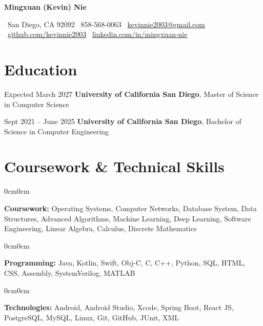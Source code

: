 \documentclass[8pt, letterpaper]{article}
\newcommand{\phone}[1]{\faPhone\ #1}
\newcommand{\email}[1]{\faEnvelope\ \href{mailto:#1}{#1}}
\newcommand{\github}[1]{\faGithub\ \href{https://#1}{#1}}
\newcommand{\linkedin}[1]{\faLinkedin\ \href{https://#1}{#1}}
\newcommand{\basicInfo}[1]{\par\noindent\small #1}
\newcommand{\addr}[1]{\faMapMarker*~#1}
\newenvironment{onecolentry}{
  \begin{adjustwidth}{0cm}{0cm}
}{
  \end{adjustwidth}
}
\newenvironment{header}{
  \setlength{\topsep}{0pt}\par\kern\topsep\centering\linespread{1.5}
}{
  \par\kern\topsep
}
\begin{document}
\normalsize

\begin{header}
  \fontsize{20pt}{20pt}\selectfont\textbf{Mingxuan (Kevin) Nie}

  \vspace{2pt}
  \basicInfo{
    \addr{San Diego, CA 92092}\quad
    \phone{858-568-0063}\quad
    \email{kevinnie2003@gmail.com}\quad
    \github{github.com/kevinnie2003}\quad
    \linkedin{linkedin.com/in/mingxuan-nie}
  }
\end{header}


\vspace{5pt}

\section{Education}

\begin{twocolentry}{Expected March 2027}
\textbf{University of California San Diego}, Master of Science in Computer Science
\end{twocolentry}

\begin{twocolentry}{Sept 2021 – June 2025}
\textbf{University of California San Diego}, Bachelor of Science in Computer Engineering
\end{twocolentry}

\section{Coursework \& Technical Skills}

\begin{onecolentry}
\textbf{Coursework:} Operating Systems, Computer Networks, Database System, Data Structures, Advanced Algorithms, Machine Learning, Deep Learning, Software Engineering, Linear Algebra, Calculus, Discrete Mathematics
\end{onecolentry}

\begin{onecolentry}
\textbf{Programming:} Java, Kotlin, Swift, Obj-C, C, C++, Python, SQL, HTML, CSS, Assembly, SystemVerilog, MATLAB
\end{onecolentry}

\begin{onecolentry}
\textbf{Technologies:} Android, Android Studio, Xcode, Spring Boot, React JS, PostgreSQL, MySQL, Linux, Git, GitHub, JUnit, XML
\end{onecolentry}
\end{document}
